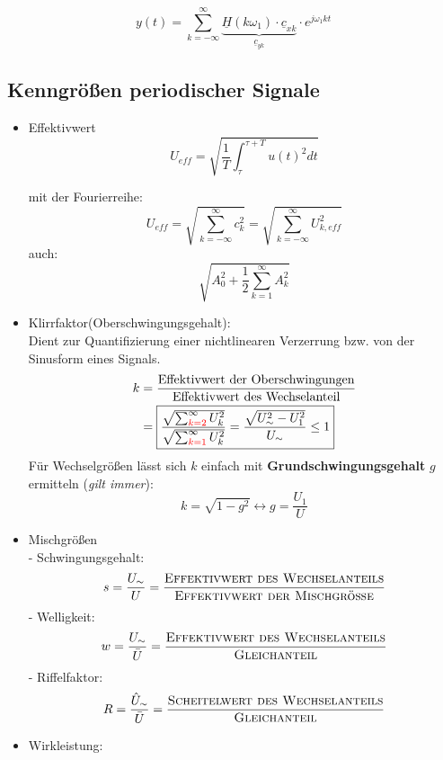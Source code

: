 \[
	y(t) = \sum_{k=-\infty}^{\infty} \underbrace{\underline{H}(k\omega_1)\cdot\underline{c}_{xk}}_{\underline{c}_{yk}} \cdot e^{j\omega_1 k t}
\]

\subsection{Kenngrößen periodischer Signale}
\begin{itemize}
	\item Effektivwert
	      \[
		      \boxed{U_{\mathit{eff}} = \sqrt{\frac{1}{T} \int_\tau^{\tau+T} u(t)^2 dt}}
	      \]
	      \begin{mdframed}[style=exercise]
		      mit der Fourierreihe:
		      $$ U_{\mathit{eff}} = \sqrt{\sum_{k=-\infty}^{\infty} c_k^2} = \sqrt{\sum_{k=-\infty}^{\infty}U_{k,\mathit{eff}}^2} $$
		      auch:
		      $$ \sqrt{A_0^2 + \frac{1}{2} \sum_{k=1}^{\infty} A_k^2} $$
	      \end{mdframed}
	\item Klirrfaktor(Oberschwingungsgehalt):\\
	      Dient zur Quantifizierung einer nichtlinearen Verzerrung bzw. von der
	      Sinusform eines Signals.
	      \begin{align*}
		      k & = \frac{\text{Effektivwert der Oberschwingungen}}{\text{Effektivwert des Wechselanteil}}                                                                                  \\
		        & = \boxed{\frac{\sqrt{\sum_{{\color{red}{k=2}}}^{\infty} U_{k}^{2}}}{\sqrt{\sum_{{\color{red}{k=1}}}^{\infty} U_{k}^{2}}} = \frac{\sqrt{U_\sim^2 - U_1^2}}{U_\sim} \leq 1}
	      \end{align*}
	      Für Wechselgrößen lässt sich $k$ einfach mit \textbf{Grundschwingungsgehalt} $g$ ermitteln (\textit{gilt immer}):
	      \[
		      \boxed{k = \sqrt{1-g^2} \leftrightarrow g = \frac{U_1}{U}}
	      \]
	\item Mischgrößen\\
	      - Schwingungsgehalt:
	      \[
		      s = \frac{U_\sim}{U} = \frac{\textsc{Effektivwert des Wechselanteils}}{\textsc{Effektivwert der Mischgröße}}
	      \]
	      - Welligkeit:
	      \[
		      w = \frac{U_\sim}{\bar{U}} = \frac{\textsc{Effektivwert des Wechselanteils}}{\textsc{Gleichanteil}}
	      \]
	      - Riffelfaktor:
	      \[
		      R = \frac{\hat{U}_\sim}{\bar{U}} = \frac{\textsc{Scheitelwert des Wechselanteils}}{\textsc{Gleichanteil}}
	      \]
	\item Wirkleistung:
	      \[
\]
\end{itemize}
